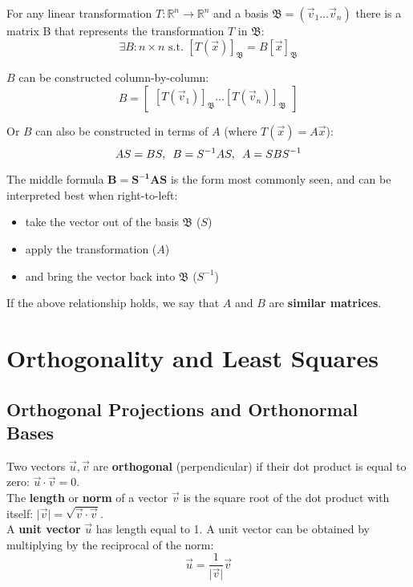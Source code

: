 \documentclass[]{scrartcl}
\begin{document}
	For any linear transformation $T: \mathbb{R}^n \rightarrow \mathbb{R}^n$ and a basis $\mathfrak{B} = (\vec{v}_1 \ldots \vec{v}_n)$ there is a matrix B that represents the transformation $T$ in $\mathfrak{B}$:
	$$
	\exists B: n \times n \text{ s.t. } [T(\vec{x})]_{\mathfrak{B}} = B[\vec{x}]_{\mathfrak{B}}
	$$
	
	$B$ can be constructed column-by-column:
	$$
	B = \begin{bmatrix}
	[T(\vec{v}_1)]_{\mathfrak{B}} \ldots [T(\vec{v}_n)]_{\mathfrak{B}}
	\end{bmatrix}
	$$
	
	Or $B$ can also be constructed in terms of $A$ (where $T(\vec{x}) = A\vec{x}$):
	$$
	AS=BS, \enskip B=S^{-1}AS, \enskip A=SBS^{-1}
	$$
	
	The middle formula $\boldsymbol{B=S^{-1}AS}$ is the form most commonly seen, and can be interpreted best when right-to-left:
	\begin{itemize}
		\item take the vector out of the basis $\mathfrak{B}$ ($S$)
		\item apply the transformation ($A$)
		\item and bring the vector back into $\mathfrak{B}$ ($S^{-1}$)
	\end{itemize}
	
	If the above relationship holds, we say that $A$ and $B$ are \textbf{similar matrices}.
	
	\setcounter{section}{4}
	\section{Orthogonality and Least Squares}
	\subsection{Orthogonal Projections and Orthonormal Bases}
	Two vectors $\vec{u}, \vec{v}$ are \textbf{orthogonal} (perpendicular) if their dot product is equal to zero: $\vec{u} \cdot \vec{v} = 0$.\\
	
	The \textbf{length} or \textbf{norm} of a vector $\vec{v}$ is the square root of the dot product with itself: $\lvert \vec{v} \rvert = \sqrt{\vec{v} \cdot \vec{v}}$.\\
	
	A \textbf{unit vector} $\vec{u}$ has length equal to 1. A unit vector can be obtained by multiplying by the reciprocal of the norm:
	$$
	\vec{u} = \frac{1}{\lvert \vec{v} \rvert} \vec{v}
	$$
	
\end{document}
